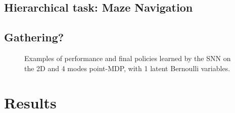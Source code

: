 \documentclass{article} %
\begin{document}
\subsection{Hierarchical task: Maze Navigation}

\subsection{Gathering?}

\begin{figure}[h!]
	\centering
	\caption{Examples of performance and final policies learned by the SNN on the 2D and 4 modes point-MDP, with 1 latent Bernoulli variables.}
	\label{fig:snn_multimodal_MI}
\end{figure}


\section{Results}
\end{document}
